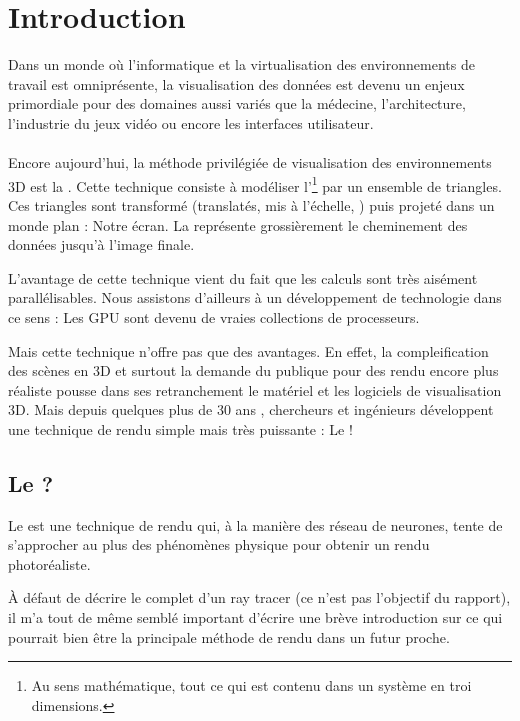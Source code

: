 \section{Introduction}
Dans un monde où l'informatique et la virtualisation des environnements de
travail est omniprésente, la visualisation des données est devenu un enjeux
primordiale pour des domaines aussi variés que la médecine, l'architecture,
l'industrie du jeux vidéo ou encore les interfaces utilisateur.

\paragraph{}
Encore aujourd'hui, la méthode privilégiée de visualisation des environnements
3D est la . Cette technique consiste à modéliser
l'\footnote{Au sens mathématique, \ie tout ce qui est contenu
dans un système en troi dimensions.} par un ensemble de triangles. Ces
triangles sont transformé (\ie translatés, mis à l'échelle, \etc) puis projeté
dans un monde plan : Notre écran. La  représente
grossièrement le cheminement des données jusqu'à l'image finale.



L'avantage de cette technique vient du fait que les calculs sont très
aisément parallélisables. Nous assistons d'ailleurs à un développement de
technologie dans ce sens : Les \gls{GPU} sont devenu de vraies collections de
processeurs.

\newpar Mais cette technique n'offre pas que des avantages. En effet, la
compleification des scènes en 3D et surtout la demande du publique pour des
rendu encore plus réaliste pousse dans ses retranchement le matériel et les
logiciels de visualisation 3D. Mais depuis quelques plus de 30 ans
\cite{Whitted1980}, chercheurs et ingénieurs développent une technique de
rendu simple mais très puissante : Le \raytracing !

\subsection{Le \raytracing ?}
Le \raytracing est une technique de rendu qui, à la manière des réseau de
neurones, tente de s'approcher au plus des phénomènes physique pour obtenir
un rendu photoréaliste. 

\newpar À défaut de décrire le  complet d'un ray tracer (ce
n'est pas l'objectif du rapport), il m'a tout de même semblé important
d'écrire une brève introduction sur ce qui pourrait bien être la principale
méthode de rendu dans un futur proche.

